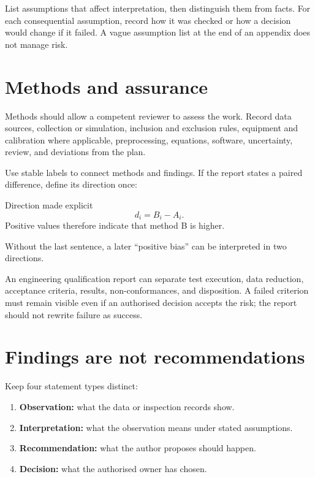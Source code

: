 List assumptions that affect interpretation, then distinguish them from facts.
For each consequential assumption, record how it was checked or how a decision
would change if it failed. A vague assumption list at the end of an appendix
does not manage risk.

\section{Methods and assurance}

Methods should allow a competent reviewer to assess the work. Record data
sources, collection or simulation, inclusion and exclusion rules, equipment and
calibration where applicable, preprocessing, equations, software, uncertainty,
review, and deviations from the plan.

Use stable labels to connect methods and findings. If the report states a paired
difference, define its direction once:

\begin{latexcode}{Direction made explicit}
\begin{equation}
  d_i = B_i-A_i.
  \label{eq:report-difference}
\end{equation}
Positive values therefore indicate that method B is higher.
\end{latexcode}

Without the last sentence, a later ``positive bias'' can be interpreted in two
directions.

\begin{scienceinpractice}
An engineering qualification report can separate test execution, data
reduction, acceptance criteria, results, non-conformances, and disposition. A
failed criterion must remain visible even if an authorised decision accepts the
risk; the report should not rewrite failure as success.
\end{scienceinpractice}

\section{Findings are not recommendations}

Keep four statement types distinct:

\begin{enumerate}
  \item \textbf{Observation:} what the data or inspection records show.
  \item \textbf{Interpretation:} what the observation means under stated
        assumptions.
  \item \textbf{Recommendation:} what the author proposes should happen.
  \item \textbf{Decision:} what the authorised owner has chosen.
\end{enumerate}

